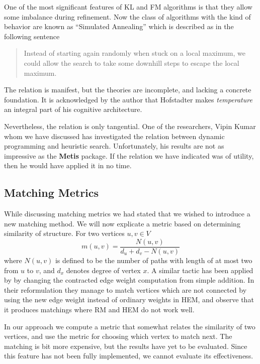 \documentclass[a4paper,12pt]{article}
\begin{document}
One of the most significant features of KL and FM algorithms is that
they allow some imbalance during refinement. Now the class of
algorithms with the kind of behavior are known as ``Simulated
Annealing'' which is described as in the following sentence
\begin{quote}
  Instead of starting again randomly when stuck on a local maximum, we
  could allow the search to take some downhill steps to escape the
  local maximum.
\end{quote}
The relation is manifest, but the theories are incomplete, and lacking
a concrete foundation. It is acknowledged by the author that
Hofstadter makes \textit{temperature} an integral part of his
cognitive architecture.

Nevertheless, the relation is only tangential. One of the researchers,
Vipin Kumar whom we have discussed has investigated the relation
between dynamic programming and heuristic search. Unfortunately, his
results are not as impressive as the \textbf{Metis}
package.\cite{metis} If the relation we have indicated was of utility,
then he would have applied it in no time.


\subsection{Matching Metrics}
While discussing matching metrics we had stated that we wished to introduce
a new matching method. We will now explicate a metric based on
determining similarity of structure. For two vertices $u,v \in V$
\begin{equation}
m(u,v) = \frac{N(u,v)}{d_u+d_v-N(u,v)}
\end{equation}
where $N(u,v)$ is defined to be the number of paths with length of at
most two from $u$ to $v$, and $d_x$ denotes degree of vertex $x$. A similar 
tactic has been applied by \cite{gupta1} by changing the contracted
edge weight computation from simple addition. In their reformulation
they manage to match vertices which are not connected by using the new
edge weight instead of ordinary weights in HEM, and observe
that it produces matchings where RM and HEM do not work well. 

In our approach we compute a metric that somewhat relates the
similarity of two vertices, and use the metric for choosing which
vertex to match next. The matching is bit more expensive, but the
results have yet to be evaluated. Since this feature has not been
fully implemented, we cannot evaluate its effectiveness.
\end{document}
